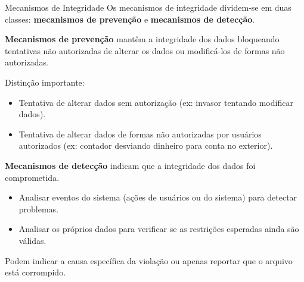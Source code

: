 \begin{frame}{Mecanismos de Integridade}
    Os mecanismos de integridade dividem-se em duas classes: \textbf{mecanismos de prevenção} e \textbf{mecanismos de detecção}.

    \vspace{0.3cm}
    \textbf{Mecanismos de prevenção} mantêm a integridade dos dados bloqueando tentativas não autorizadas de alterar os dados ou modificá-los de formas não autorizadas.

    \vspace{0.3cm}
    Distinção importante:
    \begin{itemize}
        \item Tentativa de alterar dados sem autorização (ex: invasor tentando modificar dados).
        \item Tentativa de alterar dados de formas não autorizadas por usuários autorizados (ex: contador desviando dinheiro para conta no exterior).
    \end{itemize}

    \vspace{0.3cm}
    \textbf{Mecanismos de detecção} indicam que a integridade dos dados foi comprometida.

    \begin{itemize}
        \item Analisar eventos do sistema (ações de usuários ou do sistema) para detectar problemas.
        \item Analisar os próprios dados para verificar se as restrições esperadas ainda são válidas.
    \end{itemize}

    Podem indicar a causa específica da violação ou apenas reportar que o arquivo está corrompido.


\end{frame}

